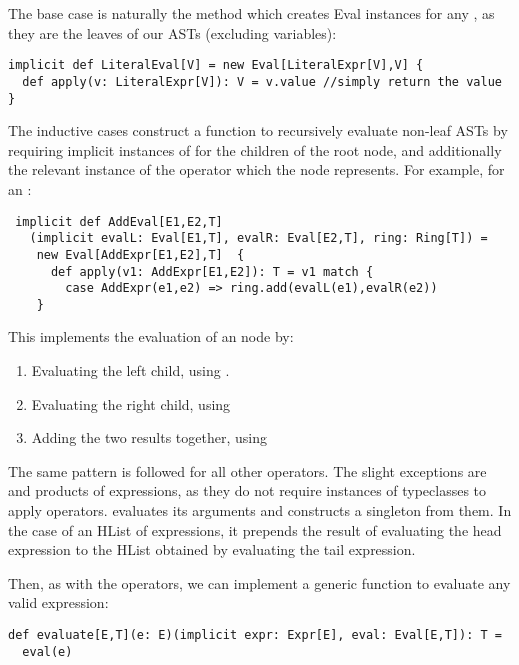 The base case is naturally the method which creates Eval instances for any , as they are the leaves of our ASTs (excluding variables):
\vs\begin{lstlisting}
implicit def LiteralEval[V] = new Eval[LiteralExpr[V],V] {
  def apply(v: LiteralExpr[V]): V = v.value //simply return the value
}
\end{lstlisting}\vs
The inductive cases construct a function to recursively evaluate non-leaf ASTs by requiring implicit instances of  for the children of the root node, and additionally the relevant instance of the operator which the node represents. For example, for an :
\vs\begin{lstlisting}
 implicit def AddEval[E1,E2,T]
   (implicit evalL: Eval[E1,T], evalR: Eval[E2,T], ring: Ring[T]) =
    new Eval[AddExpr[E1,E2],T]  {
      def apply(v1: AddExpr[E1,E2]): T = v1 match {
        case AddExpr(e1,e2) => ring.add(evalL(e1),evalR(e2))
    }
\end{lstlisting}\vs
This implements the evaluation of an  node by:
\begin{enumerate}
\item{Evaluating the left child, using }.
\item{Evaluating the right child, using }
\item{Adding the two results together, using }
\end{enumerate}
The same pattern is followed for all other operators. The slight exceptions are  and products of expressions, as they do not require instances of typeclasses to apply operators.  evaluates its arguments and constructs a singleton  from them. In the case of an HList of expressions, it prepends the result of evaluating the head expression to the HList obtained by evaluating the tail expression.

Then, as with the operators, we can implement a generic function to evaluate any valid expression:
\vs\begin{lstlisting}
def evaluate[E,T](e: E)(implicit expr: Expr[E], eval: Eval[E,T]): T =
  eval(e)
\end{lstlisting}\vs

